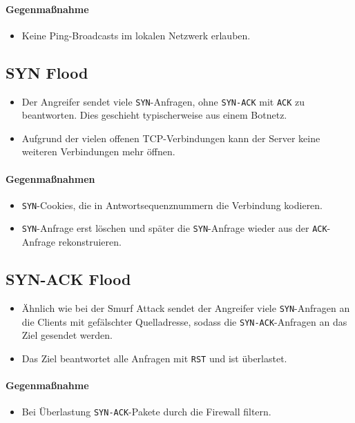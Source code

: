 		\paragraph{Gegenmaßnahme}
			\begin{itemize}
				\item Keine Ping-Broadcasts im lokalen Netzwerk erlauben.
			\end{itemize}

	\subsection{SYN Flood}
		\begin{itemize}
			\item Der Angreifer sendet viele \texttt{SYN}-Anfragen, ohne \texttt{SYN-ACK} mit \texttt{ACK} zu beantworten. Dies geschieht typischerweise aus einem Botnetz.
			\item Aufgrund der vielen offenen TCP-Verbindungen kann der Server keine weiteren Verbindungen mehr öffnen.
		\end{itemize}

		\paragraph{Gegenmaßnahmen}
			\begin{itemize}
				\item \texttt{SYN}-Cookies, die in Antwortsequenznummern die Verbindung kodieren.
				\item \texttt{SYN}-Anfrage erst löschen und später die \texttt{SYN}-Anfrage wieder aus der \texttt{ACK}-Anfrage rekonstruieren.
			\end{itemize}

	\subsection{SYN-ACK Flood}
		\begin{itemize}
			\item Ähnlich wie bei der Smurf Attack sendet der Angreifer viele \texttt{SYN}-Anfragen an die Clients mit gefälschter Quelladresse, sodass die \texttt{SYN-ACK}-Anfragen an das Ziel gesendet werden.
			\item Das Ziel beantwortet alle Anfragen mit \texttt{RST} und ist überlastet.
		\end{itemize}

		\paragraph{Gegenmaßnahme}
			\begin{itemize}
				\item Bei Überlastung \texttt{SYN-ACK}-Pakete durch die Firewall filtern.
			\end{itemize}

